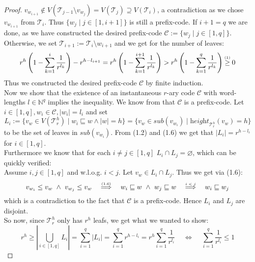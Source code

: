 \documentclass[12pt]{article}
\newcommand{\up}[2]{\mathrel{\overset{\makebox[0pt]{\mbox{\normalfont\tiny #2}}}{#1}}}
\newcommand{\T}[0]{{\mathcal{T}_r^h}}
\newcommand{\he}[0]{\textit{height}}
\newcommand{\SUB}[0]{\textit{sub}}
\newenvironment{statement3}[3]{\begin{trivlist}
\item[\hskip \labelsep {\bfseries #1}\hskip \labelsep {\bfseries #2} {#3}\textbf{.}]}{\end{trivlist}}
\begin{document}
\begin{statement3}{(1.7)}{Theorem}{(Kraft's Inequality)}
\begin{proof}
        $v_{w_{i+1}} \notin V(\mathcal{T}_{j-1} \setminus v_{w_j}) = V(\mathcal{T}_{j}) \supseteq V(\mathcal{T}_{i})$, a contradiction as we chose $v_{w_{i+1}}$ from $\mathcal{T}_i$.
        Thus $\{w_j \mid j \in [1, i+1]\}$ is still a prefix-code.
        If $i+1 = q$ we are done, as we have constructed the desired prefix-code
        $\mathcal{C} := \{w_j \mid j \in [1,q]\}$. Otherwise,
        we set $\mathcal{T}_{i+1} := \mathcal{T}_i \setminus w_{i+1}$ and we get for the number of leaves:
        $$
            r^h\left(1-\sum_{k=1}^{i} \frac{1}{r^{l_k}}\right) - r^{h - l_{i+1}}
            = r^h\left(1-\sum_{k=1}^{i+1} \frac{1}{r^{l_k}}\right)
            > r^h\left(1-\sum_{k=1}^{q} \frac{1}{r^{l_k}}\right)
            \up{\geq}{(1)} 0
        $$
        Thus we constructed the desired prefix-code $\mathcal{C}$ by finite induction.\\[10pt]
        Now we show that the existence of an instantaneous $r$-ary code $\mathcal{C}$ with word-lengths $l \in \mathbb{N}^q$ implies the inequality.
        We know from \cite{ICT} that $\mathcal{C}$ is a prefix-code. Let $i \in [1,q],
        w_i \in \mathcal{C}, |w_i| = l_i$ and set
        $$
            L_i := \{v_w \in V(\T) \mid w_i \sqsubseteq w \land |w| = h\}
            = \{v_w \in \SUB(v_{w_i}) \mid \he_\T(v_w) = h\}
        $$
        to be the set of leaves in $\SUB(v_{w_i})$. From (1.2) and (1.6) we get that $|L_i| = r^{h - l_i}$
        for $i \in [1,q]$.\\
        Furthermore we know that for each $i\neq j \in [1,q]$ $L_i \cap L_j = \varnothing$, which can be quickly
        verified:\\
        Assume $i,j \in [1,q]$ and w.l.o.g. $i < j$. Let $v_w \in L_i \cap L_j$. Thus we get via (1.6):
        $$
            v_{w_i} \leq v_w\ \land\ v_{w_j} \leq v_w
            \up{\quad\Longrightarrow\quad}{(1.6)} w_i \sqsubseteq w\ \land\ w_j \sqsubseteq w
            \up{\quad\Longrightarrow\quad}{$i < j$} w_i \sqsubseteq w_j
        $$
        which is a contradiction to the fact that $\mathcal{C}$ is a prefix-code. Hence $L_i$ and $L_j$ are disjoint.\\
        So now, since $\T$ only has $r^h$ leafs, we get what we wanted to show:
        $$
            r^h \geq |\bigcup_{i \in [1,q]} L_i| = \sum_{i = 1}^{q} |L_i| = \sum_{i=1}^{q} r^{h-l_i}
            = r^h\sum_{i=1}^{q} \frac{1}{r^{l_i}}
            \quad\,\Longleftrightarrow\,\quad \sum_{i=1}^{q} \frac{1}{r^{l_i}} \leq 1
        $$
    \end{proof}
\end{statement3}
\end{document}
